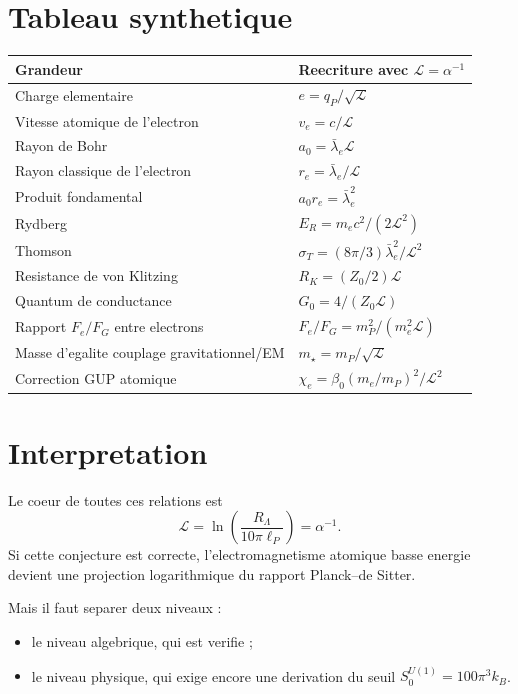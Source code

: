 \documentclass[11pt,a4paper]{article}
\newcommand{\cL}{\mathcal L}
\begin{document}
\section{Tableau synthetique}

\begin{center}
\renewcommand{\arraystretch}{1.35}
\begin{tabular}{>{\raggedright\arraybackslash}p{5.2cm} >{\raggedright\arraybackslash}p{8cm}}
\toprule
Grandeur & Reecriture avec \(\cL=\alpha^{-1}\) \\
\midrule
Charge elementaire & \(e=q_P/\sqrt{\cL}\) \\
Vitesse atomique de l'electron & \(v_e=c/\cL\) \\
Rayon de Bohr & \(a_0=\bar\lambda_e\cL\) \\
Rayon classique de l'electron & \(r_e=\bar\lambda_e/\cL\) \\
Produit fondamental & \(a_0r_e=\bar\lambda_e^2\) \\
Rydberg & \(E_R=m_ec^2/(2\cL^2)\) \\
Thomson & \(\sigma_T=(8\pi/3)\bar\lambda_e^2/\cL^2\) \\
Resistance de von Klitzing & \(R_K=(Z_0/2)\cL\) \\
Quantum de conductance & \(G_0=4/(Z_0\cL)\) \\
Rapport \(F_e/F_G\) entre electrons & \(F_e/F_G=m_P^2/(m_e^2\cL)\) \\
Masse d'egalite couplage gravitationnel/EM & \(m_\star=m_P/\sqrt{\cL}\) \\
Correction GUP atomique & \(\chi_e=\beta_0(m_e/m_P)^2/\cL^2\) \\
\bottomrule
\end{tabular}
\end{center}

\section{Interpretation}

Le coeur de toutes ces relations est
\begin{equation}
\boxed{
\cL=\ln\left(\frac{R_\Lambda}{10\pi\ell_P}\right)=\alpha^{-1}.
}
\end{equation}
Si cette conjecture est correcte, l'electromagnetisme atomique basse energie
devient une projection logarithmique du rapport Planck--de Sitter.

Mais il faut separer deux niveaux :
\begin{itemize}
\item le niveau algebrique, qui est verifie ;
\item le niveau physique, qui exige encore une derivation du seuil
\(S_0^{U(1)}=100\pi^3k_B\).
\end{itemize}
\end{document}
